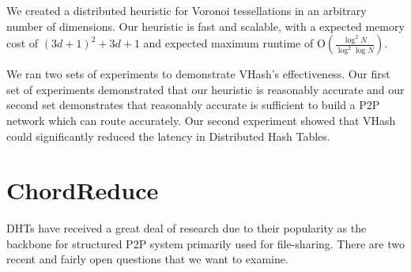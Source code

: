 We created a distributed heuristic for Voronoi tessellations in an arbitrary number of dimensions.
Our heuristic is fast and scalable, with a expected memory cost of $(3d+1)^{2}+3d+1$ and expected maximum runtime of O$(\frac{\log^{2} N}{\log^{2} \log N} )$.

We ran two sets of experiments to demonstrate VHash's effectiveness.
Our first set of experiments demonstrated that our heuristic is reasonably accurate  and our second set demonstrates that reasonably accurate is sufficient to build a P2P network which can route accurately.
Our second experiment showed that VHash  could significantly reduced the latency in Distributed Hash Tables.










\section{ChordReduce}
DHTs have received a great deal of research due to their popularity as the backbone for structured P2P system primarily used for file-sharing.
There are two recent and fairly open questions that we want to examine.

